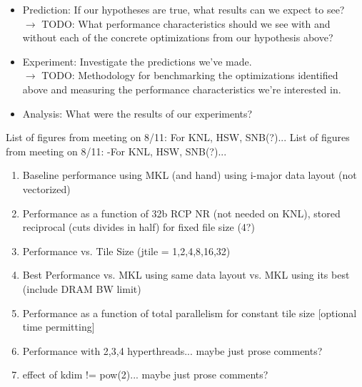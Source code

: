 \documentclass[conference]{IEEEtran}
\begin{document}
\begin{itemize}
\item Prediction: If our hypotheses are true, what results can we expect to
see? \\
$\rightarrow$ TODO: What performance characteristics should we see with and
without each of the concrete optimizations from our hypothesis above?

\item Experiment: Investigate the predictions we've made. \\
$\rightarrow$ TODO: Methodology for benchmarking the optimizations identified
above and measuring the performance characteristics we're interested
in.

\item Analysis: What were the results of our experiments?
\end{itemize}

List of figures from meeting on 8/11:
For KNL, HSW, SNB(?)...
List of figures from meeting on 8/11:
-For KNL, HSW, SNB(?)...
\begin{enumerate}
\item Baseline performance using MKL (and hand) using i-major data layout 
(not vectorized)
\item Performance as a function of 32b RCP NR (not needed on KNL), stored
reciprocal (cuts divides in half) for fixed file size (4?)
\item Performance vs. Tile Size (jtile = 1,2,4,8,16,32)
\item Best Performance vs. MKL using same data layout vs. MKL using its best
(include DRAM BW limit)
\item Performance as a function of total parallelism for constant tile size
[optional time permitting]
\item Performance with 2,3,4 hyperthreads...  maybe just prose comments?
\item effect of kdim != pow(2)... maybe just prose comments?
\end{enumerate}
\end{document}
